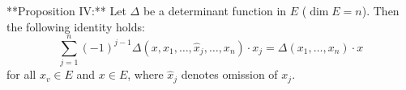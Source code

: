 **Proposition IV:** Let $\Delta$ be a determinant function in $E$ ($\dim E = n$). Then the following identity holds:
$$\sum_{j=1}^{n} (-1)^{j-1} \Delta(x, x_1, \ldots, \hat{x}_j, \ldots, x_n) \cdot x_j = \Delta(x_1, \ldots, x_n) \cdot x$$
for all $x_v \in E$ and $x \in E$, where $\hat{x}_j$ denotes omission of $x_j$.

